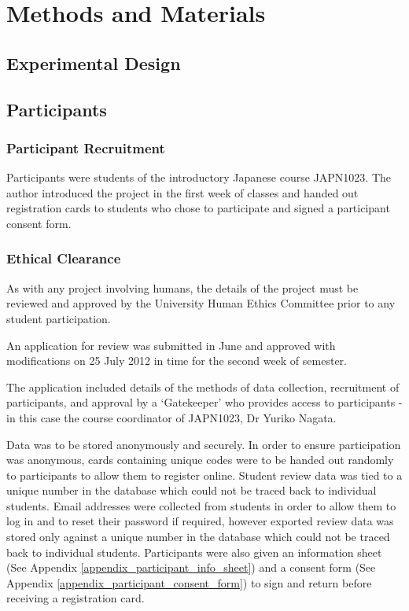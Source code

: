 \chapter{Methods and Materials}
\label{methods}

\section{Experimental Design}
\section{Participants}
\subsection{Participant Recruitment}
Participants were students of the introductory Japanese course JAPN1023. The author
introduced the project in the first week of classes and handed out registration cards
to students who chose to participate and signed a participant consent form.

\subsection{Ethical Clearance}
\label{methods_ethical}
As with any project involving humans, the details of the project must be reviewed and 
approved by the University Human Ethics Committee prior to any student participation.

An application for review was submitted in June and approved with modifications
on 25 July 2012 in time for the second week of semester.

The application included details of the methods of data collection, recruitment of participants,
and approval by a `Gatekeeper' who provides access to participants - in this case the course coordinator of JAPN1023, Dr Yuriko Nagata.

Data was to be stored anonymously and securely. In order to ensure participation was anonymous,
cards containing unique codes were to be handed out randomly to participants to allow them to
register online. Student review data was tied to a unique number in the database which could
not be traced back to individual students. Email addresses were collected from students in order
to allow them to log in and to reset their password if required, however exported review data was
stored only against a unique number in the database which could not be traced back to individual
students. Participants were also given an information sheet (See Appendix
\ref{appendix_participant_info_sheet}) and a consent form (See Appendix
\ref{appendix_participant_consent_form}) to sign and return before receiving a registration card.

